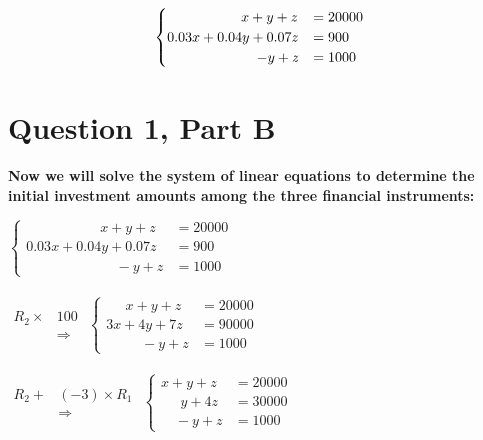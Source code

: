 \documentclass{article}
\begin{document}
$$\begin{cases} 
    \begin{equation*}
    \;\;\;\;\;\;\;\;\;\;\;\;\;\;\;\;\;\;\;x+y+z &= 20000\\
    0.03x+0.04y+0.07z &= 900\\
    \;\;\;\;\;\;\;\;\;\;\;\;\;\;\;\;\;\;\;\;\;\;\;-y+z &= 1000  
    \end{equation*}
   
\end{cases}$$

\newpage
\section*{Question 1, Part B}
\textbf{Now we will solve the system of linear equations to determine the initial investment amounts among the three financial instruments:\\}

$
\begin{cases} 
    
    \;\;\;\;\;\;\;\;\;\;\;\;\;\;\;\;\;\;\;x+y+z &= 20000\\
    0.03x+0.04y+0.07z &= 900\\
    \;\;\;\;\;\;\;\;\;\;\;\;\;\;\;\;\;\;\;\;\;\;\;-y+z &= 1000  
    
\end{cases}
$\\\\

$
\begin{aligned} 
R_2 \times& 100\\
&\Rightarrow
\end{aligned}
$
\;\;\;\;\;
$
\begin{cases} 
    
    \;\;\;\;\;x+y+z &= 20000\\
    3x+4y+7z &= 90000\\
    \;\;\;\;\;\;\;\;\;-y+z &= 1000  
    
\end{cases}
$\\\\

$
\begin{aligned} 
R_2 + &(-3)\times R_1\\
&\Rightarrow
\end{aligned}
$
\;
$
\begin{cases} 
    
    x+y+z &= 20000\\
    \;\;\;\;\;y+4z &= 30000\\
    \;\;\;\,-y+z &= 1000  
    
\end{cases}
$\\\\
\end{document}
